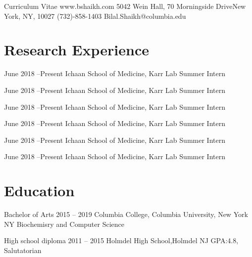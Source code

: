 \documentclass{bscv}
\begin{document}
  {Curriculum Vitae} {www.bshaikh.com} {5042 Wein Hall, 70 Morningside Drive\newline New York, NY, 10027} {(732)-858-1403} {Bilal.Shaikh@columbia.edu}


\section{Research Experience}

\begin{eventlist}
 
\item{June 2018 --Present} 
  {Ichaan School of Medicine, Karr Lab}
  {Summer Intern}
  
\item{June 2018 --Present} 
  {Ichaan School of Medicine, Karr Lab}
  {Summer Intern}
  
\item{June 2018 --Present} 
  {Ichaan School of Medicine, Karr Lab}
  {Summer Intern}

\item{June 2018 --Present} 
  {Ichaan School of Medicine, Karr Lab}
  {Summer Intern}

\item{June 2018 --Present} 
  {Ichaan School of Medicine, Karr Lab}
  {Summer Intern}

\item{June 2018 --Present} 
  {Ichaan School of Medicine, Karr Lab}
  {Summer Intern}

\end{eventlist}

\section{Education}

\begin{yearlist}

\item[Bachelor of Arts]{2015 -- 2019}
  {Columbia College, \newline Columbia University, \newline New York NY} {Biochemisry and \newline Computer Science}

\item[High school diploma]{2011 -- 2015}
  {Holmdel High School,\newline Holmdel NJ}
  {GPA:4.8, Salutatorian}
   
\end{yearlist}
\end{document}
